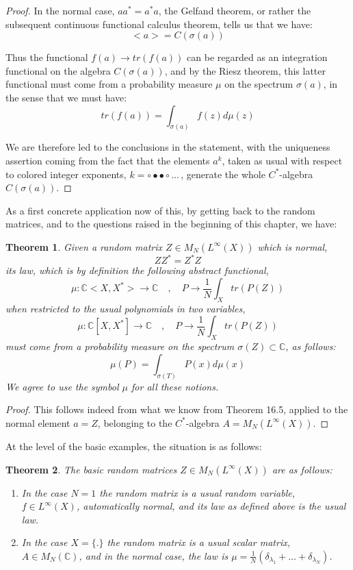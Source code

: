 \documentclass[12pt]{amsbook}
\newtheorem{theorem}{Theorem}[chapter]
\begin{document}
\begin{proof}
In the normal case, $aa^*=a^*a$, the Gelfand theorem, or rather the subsequent continuous functional calculus theorem, tells us that we have: 
$$<a>=C(\sigma(a))$$

Thus the functional $f(a)\to tr(f(a))$ can be regarded as an integration functional on the algebra $C(\sigma(a))$, and by the Riesz theorem, this latter functional must come from a probability measure $\mu$ on the spectrum $\sigma(a)$, in the sense that we must have:
$$tr(f(a))=\int_{\sigma(a)}f(z)d\mu(z)$$

We are therefore led to the conclusions in the statement, with the uniqueness assertion coming from the fact that the elements $a^k$, taken as usual with respect to colored integer exponents, $k=\circ\bullet\bullet\circ\ldots$\,, generate the whole $C^*$-algebra $C(\sigma(a))$.
\end{proof}

As a first concrete application now of this, by getting back to the random matrices, and to the questions raised in the beginning of this chapter, we have:

\begin{theorem}
Given a random matrix $Z\in M_N(L^\infty(X))$ which is normal, 
$$ZZ^*=Z^*Z$$
its law, which is by definition the following abstract functional,
$$\mu:\mathbb C<X,X^*>\to\mathbb C\quad,\quad 
P\to\frac{1}{N}\int_Xtr(P(Z))$$
when restricted to the usual polynomials in two variables,
$$\mu:\mathbb C[X,X^*]\to\mathbb C\quad,\quad 
P\to\frac{1}{N}\int_Xtr(P(Z))$$
must come from a probability measure on the spectrum $\sigma(Z)\subset\mathbb C$, as follows:
$$\mu(P)=\int_{\sigma(T)}P(x)d\mu(x)$$
We agree to use the symbol $\mu$ for all these notions.
\end{theorem}

\begin{proof}
This follows indeed from what we know from Theorem 16.5, applied to the normal element $a=Z$, belonging to the $C^*$-algebra $A=M_N(L^\infty(X))$. 
\end{proof}

At the level of the basic examples, the situation is as follows:

\begin{theorem}
The basic random matrices $Z\in M_N(L^\infty(X))$ are as follows:
\begin{enumerate}
\item In the case $N=1$ the random matrix is a usual random variable, $f\in L^\infty(X)$, automatically normal, and its law as defined above is the usual law.

\item In the case $X=\{.\}$ the random matrix is a usual scalar matrix, $A\in M_N(\mathbb C)$, and in the normal case, the law is $\mu=\frac{1}{N}\left(\delta_{\lambda_1}+\ldots+\delta_{\lambda_N}\right)$.
\end{enumerate}
\end{theorem}
\end{document}
